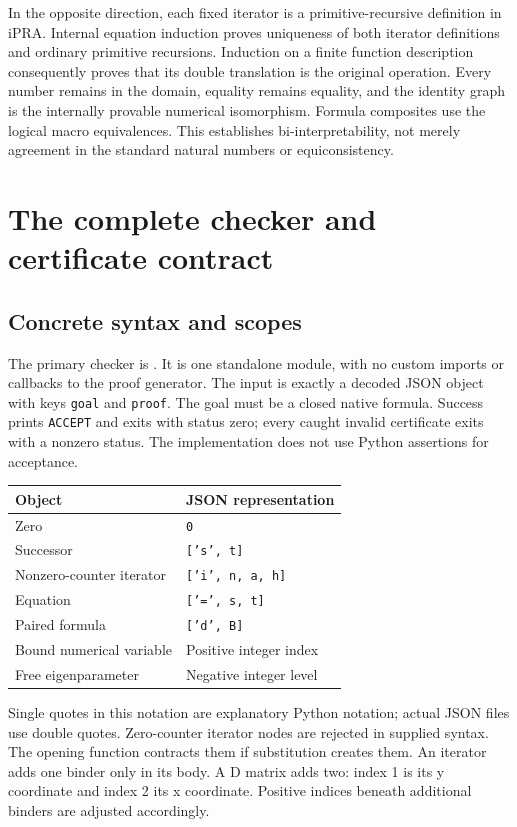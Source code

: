 \documentclass[11pt,letterpaper]{article}
\theoremstyle{definition}
\begin{document}
In the opposite direction, each fixed iterator is a primitive-recursive
definition in iPRA. Internal equation induction proves uniqueness of
both iterator definitions and ordinary primitive recursions. Induction
on a finite function description consequently proves that its double
translation is the original operation. Every number remains in the
domain, equality remains equality, and the identity graph is the
internally provable numerical isomorphism. Formula composites use the
logical macro equivalences. This establishes bi-interpretability, not
merely agreement in the standard natural numbers or equiconsistency.

\section{The complete checker and certificate contract}
\label{sec:checker}

\subsection{Concrete syntax and scopes}

The primary checker is . It is one standalone
module, with no custom imports or callbacks to the proof generator.
The input is exactly a decoded JSON object with keys \texttt{goal}
and \texttt{proof}. The goal must be a closed native formula. Success
prints \texttt{ACCEPT} and exits with status zero; every caught invalid
certificate exits with a nonzero status. The implementation does not
use Python assertions for acceptance.

\begin{center}
\begin{tabular}{ll}
\toprule
Object & JSON representation\\
\midrule
Zero & \texttt{0}\\
Successor & \texttt{['s', t]}\\
Nonzero-counter iterator & \texttt{['i', n, a, h]}\\
Equation & \texttt{['=', s, t]}\\
Paired formula & \texttt{['d', B]}\\
Bound numerical variable & Positive integer index\\
Free eigenparameter & Negative integer level\\
\bottomrule
\end{tabular}
\end{center}
Single quotes in this notation are explanatory Python notation; actual
JSON files use double quotes. Zero-counter iterator nodes are rejected
in supplied syntax. The opening function contracts them if substitution
creates them. An iterator adds one binder only in its body. A D matrix
adds two: index 1 is its y coordinate and index 2 its x coordinate.
Positive indices beneath additional binders are adjusted accordingly.
\end{document}
